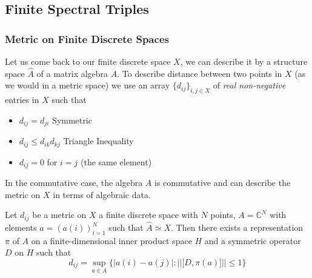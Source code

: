 \subsection{Finite Spectral Triples}
\subsubsection{Metric on Finite Discrete Spaces}
Let us come back to our finite discrete space $X$, we can describe it by a
structure space $\hat{A}$ of a matrix algebra $A$. To describe distance between
two points in $X$ (as we would in a metric space) we use an array $\{d_{ij}\}_{i,
j \in X}$ of \textit{real non-negative} entries in $X$ such that
\begin{itemize}
    \item $d_{ij} = d_{ji}$             Symmetric
    \item $d_{ij} \leq d_{ik} d_{kj}$       Triangle Inequality
    \item $d_{ij} = 0$ for $i=j$ (the same element)
\end{itemize}

In the commutative case, the algebra $A$ is commutative and can describe the
metric on $X$ in terms of algebraic data.
\begin{theorem}
    Let $d_{ij}$ be a metric on $X$ a finite discrete space with $N$ points, $A = \mathbb{C}^N$
    with elements $a = (a(i))_{i=1}^N$ such that $\hat{A} \simeq X$. Then there exists a
    representation $\pi$ of $A$ on a finite-dimensional inner product space $H$ and a symmetric
    operator $D$ on $H$ such that
    \begin{equation}
        d_{ij} = \sup_{a\in A}\bigg\{\big|a(i)-a(j)\big| : |\big|\big[D,
            \pi(a)]\big|\big| \leq 1\bigg\}
    \end{equation}
\end{theorem}

